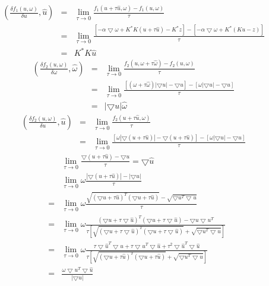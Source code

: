 \documentclass[a4paper,12pt]{article}
\begin{document}
\begin{eqnarray}
\left(
\frac{\delta f_1(u,\omega)}{\delta u},\hat{u} 
\right)
&=&\lim_{\tau \to 0}\frac{f_1(u+\tau \hat{u},\omega)-f_1(u,\omega)}{\tau}
\nonumber\\
&=&\lim_{\tau \to 0}\frac{[-\alpha \bigtriangledown \omega+K^*K(u+\tau \hat{u})-K^*z]-[-\alpha \bigtriangledown \omega+K^*(Ku-z)]}{\tau}
\nonumber\\
&=&K^*K\hat{u}
\end{eqnarray}
\begin{eqnarray}
\left(
\frac{\delta f_2(u,\omega)}{\delta \omega},\hat{\omega} 
\right)
&=&\lim_{\tau \to 0}\frac{f_2(u,\omega+\tau \hat{\omega})-f_2(u,\omega)}{\tau}
\nonumber\\
&=&\lim_{\tau \to 0}\frac{[(\omega+\tau \hat{\omega})|\bigtriangledown u|-\bigtriangledown u]-[\omega|\bigtriangledown u|-\bigtriangledown u]}{\tau}
\nonumber\\
&=&|\bigtriangledown u|\hat{\omega}
\end{eqnarray}
\begin{eqnarray}
\left(
\frac{\delta f_2(u,\omega)}{\delta u},\hat{u} 
\right)
&=&\lim_{\tau \to 0}\frac{f_2(u+\tau \hat{u},\omega)}{\tau}
\\
&=&\lim_{\tau \to 0}\frac{[\omega|\bigtriangledown (u+\tau \hat{u})|-\bigtriangledown(u+\tau \hat{u})]-[\omega|\bigtriangledown u|-\bigtriangledown u]}{\tau}
\nonumber
\end{eqnarray}
\begin{eqnarray}
&&\lim_{\tau \to 0}\frac{\bigtriangledown(u+\tau \hat{u})-\bigtriangledown u}{\tau}=\bigtriangledown \hat{u}
\\
&&\lim_{\tau \to 0} \omega\frac{|\bigtriangledown (u+\tau \hat{u})|-|\bigtriangledown u|}{\tau}
\nonumber\\
&=&\lim_{\tau \to 0} \omega\frac{\sqrt{(\bigtriangledown u+\tau \hat{u})^T(\bigtriangledown u+\tau \hat{u})}-\sqrt{\bigtriangledown u^T\bigtriangledown u}}{\tau}
\nonumber\\
&=&\lim_{\tau \to 0} \omega\frac{(\bigtriangledown u+\tau \bigtriangledown \hat{u})^T(\bigtriangledown u+\tau \bigtriangledown \hat{u})-\bigtriangledown u\bigtriangledown u^T}{\tau[\sqrt{(\bigtriangledown u+\tau \bigtriangledown \hat{u})^T(\bigtriangledown u+\tau \bigtriangledown \hat{u})}+\sqrt{\bigtriangledown u^T\bigtriangledown u}]}
\nonumber\\
&=&\lim_{\tau \to 0} \omega\frac{\tau\bigtriangledown \hat{u}^T \bigtriangledown u+\tau  \bigtriangledown u^T\bigtriangledown \hat{u}+\tau^2\bigtriangledown \hat{u}^T \bigtriangledown \hat{u}}{\tau[\sqrt{(\bigtriangledown u+\tau \hat{u})^T(\bigtriangledown u+\tau \hat{u})}+\sqrt{\bigtriangledown u^T\bigtriangledown u}]}
\nonumber\\
&=&\frac{\omega\bigtriangledown u^T \bigtriangledown \hat{u}}{|\bigtriangledown u|}
\end{eqnarray}
\end{document}
